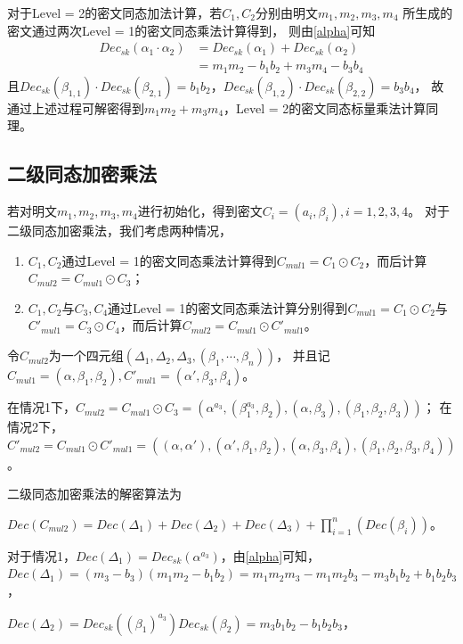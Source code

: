 \documentclass[12pt, a4paper, oneside]{ctexart}
\begin{document}
对于Level = 2的密文同态加法计算，若$C_1,C_2$分别由明文$m_1,m_2,m_3,m_4$
所生成的密文通过两次Level = 1的密文同态乘法计算得到，
则由\ref{alpha}可知
\begin{equation}
    \begin{split}
        Dec_{sk}(\alpha_1\cdot \alpha_2)&= Dec_{sk}(\alpha_1)+Dec_{sk}(\alpha_2)\\
        &= m_1m_2-b_1b_2+m_3m_4-b_3b_4
    \end{split}
\end{equation}
且$Dec_{sk}(\beta_{1,1})\cdot Dec_{sk}(\beta_{2,1}) = b_1b_2$，$Dec_{sk}(\beta_{1,2})\cdot Dec_{sk}(\beta_{2,2}) = b_3b_4$，
故通过上述过程可解密得到$m_1m_2+m_3m_4$，Level = 2的密文同态标量乘法计算同理。

\subsection{二级同态加密乘法}
若对明文$m_1,m_2,m_3,m_4$进行初始化，得到密文$C_i=(a_i,\beta_i),i=1,2,3,4$。
对于二级同态加密乘法，我们考虑两种情况，
\begin{enumerate}[(1)]
    \item $C_1,C_2$通过Level = 1的密文同态乘法计算得到$C_{mul1}=C_1\odot C_2 $，而后计算$C_{mul2}=C_{mul1}\odot C_3 $；
    \item $C_1,C_2$与$C_3,C_4$通过Level = 1的密文同态乘法计算分别得到$C_{mul1}=C_1\odot C_2 $与$C'_{mul1}=C_3\odot C_4 $，而后计算$C_{mul2}=C_{mul1}\odot C'_{mul1} $。
\end{enumerate}

令$C_{mul2}$为一个四元组$ (\Delta_1,\Delta_2,\Delta_3,(\beta_1,\cdots,\beta_n))$，
并且记$C_{mul1}= (\alpha,\beta_1,\beta_2),C'_{mul1}= (\alpha',\beta_3,\beta_4)$。

在情况1下，$C_{mul2}=C_{mul1}\odot C_3 = (\alpha^{a_3},(\beta_1^{a_3},\beta_2),(\alpha,\beta_3),(\beta_1,\beta_2,\beta_3))$；
在情况2下，$C'_{mul2}=C_{mul1}\odot C'_{mul1} =((\alpha,\alpha'),(\alpha',\beta_1,\beta_2),(\alpha, \beta_3,\beta_4),(\beta_1,\beta_2,\beta_3,\beta_4))$。

二级同态加密乘法的解密算法为

$Dec(C_{mul2}) = Dec(\Delta_1)+Dec(\Delta_2)+Dec(\Delta_3)+\prod_{i=1}^n(Dec(\beta_i))$。

对于情况1，$Dec(\Delta_1) = Dec_{sk}(\alpha^{a_3}) $，由\ref{alpha}可知，
$Dec(\Delta_1) = (m_3-b_3)(m_1m_2-b_1b_2)=m_1m_2m_3-m_1m_2b_3-m_3b_1b_2+b_1b_2b_3$，

$Dec(\Delta_2) = Dec_{sk}((\beta_1)^{a_3})Dec_{sk}(\beta_2) =m_3b_1b_2-b_1b_2b_3 $，
\end{document}
